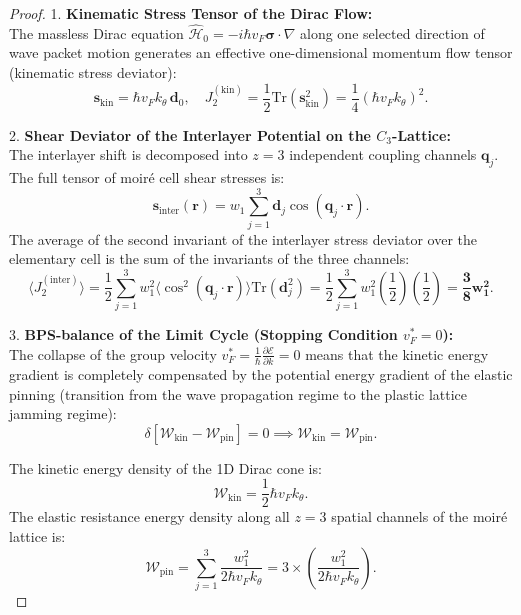 \documentclass[12pt,a4paper]{article}
\begin{document}
	\begin{proof}
	1. \textbf{Kinematic Stress Tensor of the Dirac Flow:}\\
	The massless Dirac equation $\hat{\mathcal{H}}_0 = -i \hbar v_F \boldsymbol{\sigma} \cdot \nabla$ along one selected direction of wave packet motion generates an effective one-dimensional momentum flow tensor (kinematic stress deviator):
	\begin{equation}
	\mathbf{s}_{\text{kin}} = \hbar v_F k_\theta \, \mathbf{d}_0, \quad J_2^{(\text{kin})} = \frac{1}{2}\mathrm{Tr}(\mathbf{s}_{\text{kin}}^2) = \frac{1}{4} (\hbar v_F k_\theta)^2.
	\end{equation}
			
	2. \textbf{Shear Deviator of the Interlayer Potential on the $C_3$-Lattice:}\\
	The interlayer shift is decomposed into $z=3$ independent coupling channels $\mathbf{q}_j$. The full tensor of moiré cell shear stresses is:
	\begin{equation}
	\mathbf{s}_{\text{inter}}(\mathbf{r}) = w_1 \sum_{j=1}^3 \mathbf{d}_j \cos(\mathbf{q}_j \cdot \mathbf{r}).
	\end{equation}
	The average of the second invariant of the interlayer stress deviator over the elementary cell is the sum of the invariants of the three channels:
	\begin{equation}
	\langle J_2^{(\text{inter})} \rangle = \frac{1}{2} \sum_{j=1}^3 w_1^2 \langle \cos^2(\mathbf{q}_j \cdot \mathbf{r}) \rangle \mathrm{Tr}(\mathbf{d}_j^2) = \frac{1}{2} \sum_{j=1}^3 w_1^2 \left(\frac{1}{2}\right) \left(\frac{1}{2}\right) = \mathbf{\frac{3}{8} w_1^2}.
	\end{equation}
			
	3. \textbf{BPS-balance of the Limit Cycle (Stopping Condition $v_F^* = 0$):}\\
	The collapse of the group velocity $v_F^* = \frac{1}{\hbar}\frac{\partial \mathcal{E}}{\partial k} = 0$ means that the kinetic energy gradient is completely compensated by the potential energy gradient of the elastic pinning (transition from the wave propagation regime to the plastic lattice jamming regime):
	\begin{equation}
	\delta \left[ \mathcal{W}_{\text{kin}} - \mathcal{W}_{\text{pin}} \right] = 0 \implies \mathcal{W}_{\text{kin}} = \mathcal{W}_{\text{pin}}.
	\end{equation}
			
	The kinetic energy density of the 1D Dirac cone is:
	\begin{equation}
	\mathcal{W}_{\text{kin}} = \frac{1}{2} \hbar v_F k_\theta.
	\end{equation}
	The elastic resistance energy density along all $z=3$ spatial channels of the moiré lattice is:
	\begin{equation}
	\mathcal{W}_{\text{pin}} = \sum_{j=1}^3 \frac{w_1^2}{2 \hbar v_F k_\theta} = 3 \times \left( \frac{w_1^2}{2 \hbar v_F k_\theta} \right).
	\end{equation}
			

\end{proof}
\end{document}
